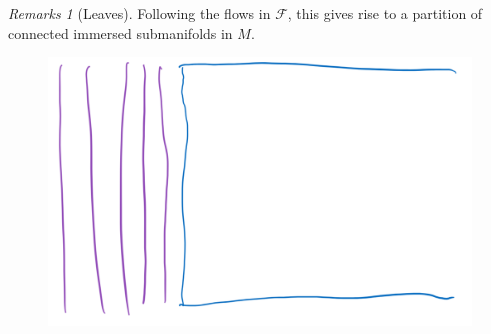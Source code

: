 \documentclass[hyperref={pdfpagelabels=false}]{beamer}
\theoremstyle{plain}
\theoremstyle{remark}
\newtheorem*{remark}{Remarks}
\begin{document}
\begin{frame}
\begin{remark}[Leaves]
Following the flows in $\mathcal{F}$, this gives rise to a partition of connected immersed submanifolds in $M$.
\end{remark}

\begin{figure}[htbp]
	\centering
		\includegraphics[width=.70\textwidth]{Foliation example.png}
	\label{fig:Foliation example}
\end{figure}


\end{frame}

%
\end{document}
